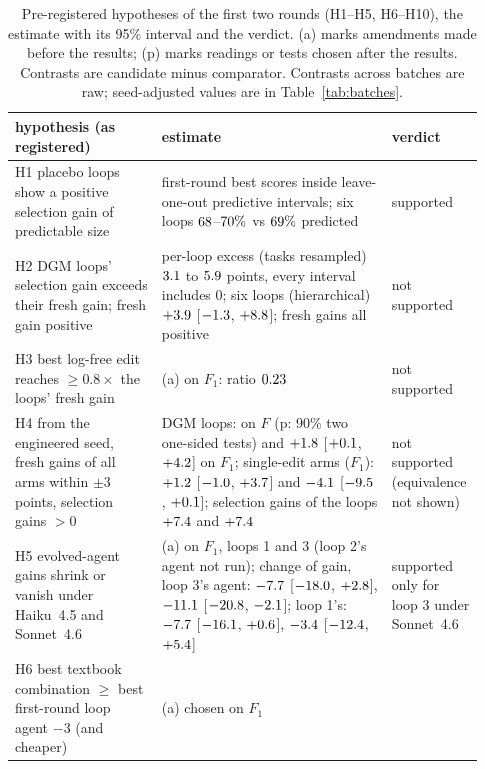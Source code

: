 \begin{table}[t]\centering\footnotesize
\caption{Pre-registered hypotheses of the first two rounds (H1--H5, H6--H10), the estimate with its 95\% interval and
the verdict. (a) marks amendments made before the results; (p) marks readings or tests chosen after the results.
Contrasts are candidate minus comparator. Contrasts across batches are raw; seed-adjusted values are in Table~\ref{tab:batches}.}\label{tab:hyp}
\setlength{\tabcolsep}{3pt}
\begin{tabular}{>{\raggedright\arraybackslash}p{0.30\linewidth}>{\raggedright\arraybackslash}p{0.47\linewidth}>{\raggedright\arraybackslash}p{0.16\linewidth}}\toprule
hypothesis (as registered) & estimate & verdict \\ \midrule
H1 placebo loops show a positive selection gain of predictable size & first-round best scores inside leave-one-out
predictive intervals; six loops $68$--$70\%$ vs $69\%$ predicted & supported \\
H2 DGM loops' selection gain exceeds their fresh gain; fresh gain positive & per-loop excess (tasks resampled)
$3.1$ to $5.9$ points, every interval includes 0; six loops (hierarchical) $+3.9$
[$-1.3$, $+8.8$]; fresh gains all positive & not supported \\
H3 best log-free edit reaches $\geq 0.8\times$ the loops' fresh gain & (a) on $F_1$: ratio $0.23$ & not
supported \\
H4 from the engineered seed, fresh gains of all arms within $\pm 3$ points, selection gains $> 0$ & DGM loops:
\nhFourCI{} on $F$ (p: 90\% two one-sided tests) and $+1.8$ [$+0.1$, $+4.2$] on $F_1$;
single-edit arms ($F_1$): $+1.2$ [$-1.0$, $+3.7$] and $-4.1$ [$-9.5$,
$+0.1$]; selection gains of the loops $+7.4$ and $+7.4$ & not supported (equivalence not
shown) \\
H5 evolved-agent gains shrink or vanish under Haiku~4.5 and Sonnet~4.6 & (a) on $F_1$, loops 1 and 3 (loop 2's agent
not run); change of gain, loop 3's agent: $-7.7$ [$-18.0$, $+2.8$], $-11.1$
[$-20.8$, $-2.1$]; loop 1's: $-7.7$ [$-16.1$, $+0.6$], $-3.4$
[$-12.4$, $+5.4$] & supported only for loop 3 under Sonnet~4.6 \\ \midrule
H6 best textbook combination $\geq$ best first-round loop agent $-3$ (and cheaper) & (a) chosen on $F_1$

\end{tabular}
\end{table}
